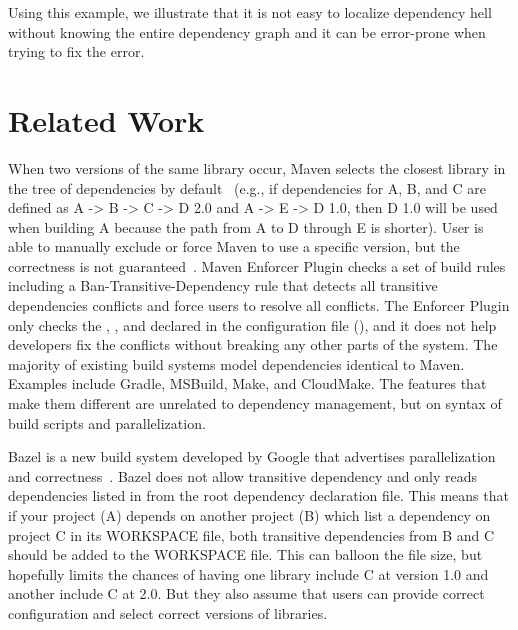 
Using this example, we illustrate that  it is not easy to  localize dependency hell without knowing the entire dependency graph and it can be error-prone when trying to fix the error.

\section{Related Work}

When two versions of the same library occur, Maven selects the closest library  in the tree of dependencies by default~\cite{maven:depend} (e.g., if dependencies for A, B, and C are defined as A -> B -> C -> D 2.0 and A -> E -> D 1.0, then D 1.0 will be used when building A because the path from A to D through E is shorter). User is able to manually exclude or force Maven to use a specific version, but the correctness is not guaranteed~\cite{maven:note}. Maven Enforcer Plugin checks a set of build rules including a Ban-Transitive-Dependency rule that detects all transitive dependencies conflicts and force users to resolve all conflicts. The Enforcer Plugin only checks the , , and  declared in the configuration file (), and it does not help developers fix the conflicts without breaking any other parts of the system.
The majority of existing build systems model dependencies identical to Maven. Examples include Gradle, MSBuild, Make, and CloudMake. The features that make them different are unrelated to dependency management, but on syntax of build scripts and parallelization. 

Bazel is a new build system developed by Google that advertises parallelization and correctness~\cite{bazel:depend}. Bazel does not allow transitive dependency and only reads dependencies listed in from the root dependency declaration file. This means that if your project (A) depends on another project (B) which list a dependency on project C in its WORKSPACE file, both transitive dependencies from B and C should be added to the WORKSPACE file. This can balloon the file size, but hopefully limits the chances of having one library include C at version 1.0 and another include C at 2.0. But they also assume that users can provide correct configuration and select correct versions of libraries. 

